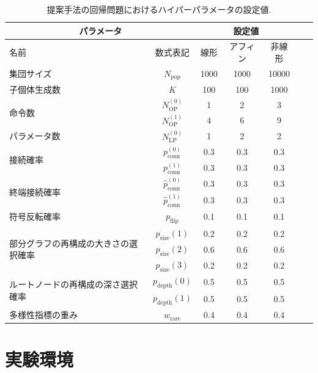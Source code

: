 \documentclass[11pt,oneside,openany,report]{jsbook}
\begin{document}
\begin{table}[tbp]
  \caption{提案手法の回帰問題におけるハイパーパラメータの設定値.}
  \label{table:exp
  :setting:proposed}
  \centering
  \begin{tabular}{|l|c|c|c|c|c|c|}
    \hline
    \multicolumn{2}{|c|}{パラメータ} & \multicolumn{3}{c|}{設定値} \\
    \hline
    名前 & 数式表記 & 線形 & アフィン & 非線形 \\
    \hline
    \hline
    集団サイズ    & $N_\mathrm{pop}$ & 1000 & 1000 & 10000 \\
    \hline
    子個体生成数  & $K$ & 100 & 100 & 1000 \\
    \hline
    \multirow{2}{*}{命令数}
    & $N_\mathrm{OP}^{(0)}$ & 1 & 2 & 3 \\
    & $N_\mathrm{OP}^{(1)}$ & 4 & 6 & 9 \\
    \hline
    パラメータ数 & $N_\mathrm{LP}^{(0)}$ & 1 & 2 & 2 \\
    \hline
    \multirow{2}{*}{接続確率}
    & $p^{(0)}_\mathrm{conn}$ & 0.3 & 0.3 & 0.3 \\
    & $p^{(1)}_\mathrm{conn}$ & 0.3 & 0.3 & 0.3 \\
    \hline
    \multirow{2}{*}{終端接続確率}
    & $\hat{p}^{(0)}_\mathrm{conn}$ & 0.3 & 0.3 & 0.3 \\
    & $\hat{p}^{(1)}_\mathrm{conn}$ & 0.3 & 0.3 & 0.3 \\
    \hline
    符号反転確率 & $p_\mathrm{flip}$ & 0.1 & 0.1 & 0.1 \\
    \hline
    \multirow{3}{*}{部分グラフの再構成の大きさの選択確率}
    & $p_\mathrm{size}(1)$ & 0.2 & 0.2 & 0.2 \\
    & $p_\mathrm{size}(2)$ & 0.6 & 0.6 & 0.6 \\
    & $p_\mathrm{size}(3)$ & 0.2 & 0.2 & 0.2 \\
    \hline
    \multirow{2}{*}{ルートノードの再構成の深さ選択確率}
    & $p_\mathrm{depth}(0)$ & 0.5 & 0.5 & 0.5 \\
    & $p_\mathrm{depth}(1)$ & 0.5 & 0.5 & 0.5 \\
    \hline
    多様性指標の重み & $w_\mathrm{rare}$ & 0.4 & 0.4 & 0.4 \\
    \hline
  \end{tabular}
\end{table}

\section{実験環境}\label{sec:proposed:exp:environement}
\end{document}
